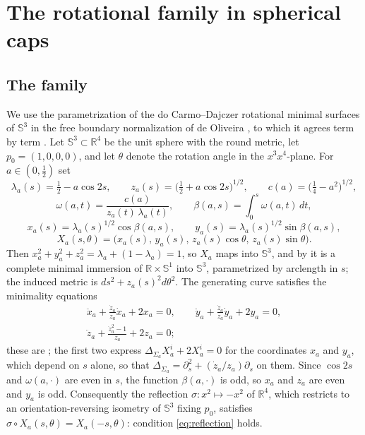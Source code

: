 \documentclass[11pt,a4paper]{amsart}
\theoremstyle{plain}
\theoremstyle{definition}
\newcommand{\R}{\mathbb{R}}
\newcommand{\Sph}{\mathbb{S}}
\begin{document}
\section{The rotational family in spherical caps}\label{sec:caps}

\subsection*{The family}

We use the parametrization of the do Carmo--Dajczer rotational minimal surfaces of $\Sph^3$ in the free boundary normalization of de Oliveira \cite{dO24}, to which it agrees term by term \cite[eq. (1)--(6)]{dO24}. Let $\Sph^3\subset\R^4$ be the unit sphere with the round metric, let $p_0=(1,0,0,0)$, and let $\theta$ denote the rotation angle in the $x^3x^4$-plane. For $a\in(0,\tfrac12)$ set
\begin{equation}\label{eq:dO-defs}
\lambda_a(s)=\tfrac12-a\cos 2s,\qquad z_a(s)=\bigl(\tfrac12+a\cos 2s\bigr)^{1/2},\qquad c(a)=\bigl(\tfrac14-a^2\bigr)^{1/2},
\end{equation}
\begin{equation}\label{eq:dO-omega}
\omega(a,t)=\frac{c(a)}{z_a(t)\,\lambda_a(t)},\qquad \beta(a,s)=\int_0^s\omega(a,t)\,dt,
\end{equation}
\begin{equation}\label{eq:dO-imm}
x_a(s)=\lambda_a(s)^{1/2}\cos\beta(a,s),\qquad y_a(s)=\lambda_a(s)^{1/2}\sin\beta(a,s),
\end{equation}
\begin{equation}\label{eq:dO-X}
X_a(s,\theta)=\bigl(x_a(s),\,y_a(s),\,z_a(s)\cos\theta,\,z_a(s)\sin\theta\bigr).
\end{equation}
Then $x_a^2+y_a^2+z_a^2=\lambda_a+(1-\lambda_a)=1$, so $X_a$ maps into $\Sph^3$, and by \cite[Prop. 2.1]{dO24} it is a complete minimal immersion of $\R\times\Sph^1$ into $\Sph^3$, parametrized by arclength in $s$; the induced metric is $ds^2+z_a(s)^2d\theta^2$. The generating curve satisfies the minimality equations
\begin{equation}\label{eq:dO-ode}
\begin{gathered}
\ddot x_a+\frac{\dot z_a}{z_a}\dot x_a+2x_a=0,\qquad
\ddot y_a+\frac{\dot z_a}{z_a}\dot y_a+2y_a=0,\\[2pt]
\ddot z_a+\frac{\dot z_a^2-1}{z_a}+2z_a=0 ;
\end{gathered}
\end{equation}
these are \cite[eq. (9)--(11)]{dO24}; the first two express $\Delta_{\Sigma_a}X_a^i+2X_a^i=0$ for the coordinates $x_a$ and $y_a$, which depend on $s$ alone, so that $\Delta_{\Sigma_a}=\partial_s^2+(\dot z_a/z_a)\partial_s$ on them.
Since $\cos 2s$ and $\omega(a,\cdot)$ are even in $s$, the function $\beta(a,\cdot)$ is odd, so $x_a$ and $z_a$ are even and $y_a$ is odd. Consequently the reflection $\sigma:x^2\mapsto-x^2$ of $\R^4$, which restricts to an orientation-reversing isometry of $\Sph^3$ fixing $p_0$, satisfies $\sigma\circ X_a(s,\theta)=X_a(-s,\theta)$: condition \eqref{eq:reflection} holds.
\end{document}
